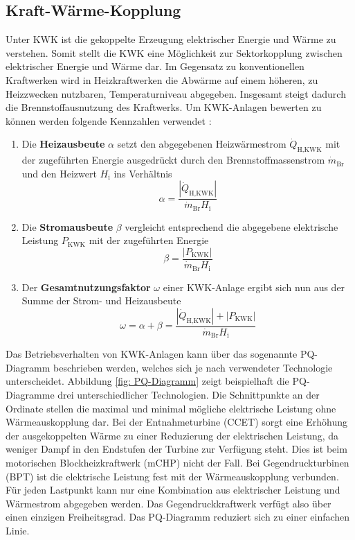 \subsection{Kraft-Wärme-Kopplung}
Unter \acf{KWK} ist die gekoppelte Erzeugung elektrischer Energie und Wärme zu verstehen. Somit stellt die \ac{KWK} eine Möglichkeit zur Sektorkopplung zwischen elektrischer Energie und Wärme dar. Im Gegensatz zu konventionellen Kraftwerken wird in Heizkraftwerken die Abwärme auf einem höheren, zu Heizzwecken nutzbaren, Temperaturniveau abgegeben. Insgesamt steigt dadurch die Brennstoffausnutzung des Kraftwerks. Um \ac{KWK}-Anlagen bewerten zu können werden folgende Kennzahlen verwendet \cite{VDI4608}:
	\begin{enumerate}
		\item Die \textbf{Heizausbeute} $\alpha$ setzt den abgegebenen Heizwärmestrom $\dot{Q}_\text{H,KWK}$ mit der zugeführten Energie ausgedrückt durch den Brennstoffmassenstrom $\dot{m}_\text{Br}$ und den Heizwert $H_\text{i}$ ins Verhältnis
		\begin{equation}\label{equation: Heizausbeute}
			\alpha = \dfrac{|\dot{Q}_\text{H,KWK}|}{\dot{m}_\text{Br}H_\text{i}}
		\end{equation}	
		
		\item Die \textbf{Stromausbeute} $\beta$ vergleicht entsprechend die abgegebene elektrische Leistung $P_\text{KWK}$ mit der zugeführten Energie
		\begin{equation}\label{equation: Stromausbeute}
			\beta = \dfrac{|P_\text{KWK}|}{\dot{m}_\text{Br}H_\text{i}}
		\end{equation}
		
		\item Der \textbf{Gesamtnutzungsfaktor} $\omega$ einer \ac{KWK}-Anlage ergibt sich nun aus der Summe der Strom- und Heizausbeute
		\begin{equation}\label{equation: Gesamtnutzungsfaktor}
			\omega = \alpha + \beta = \dfrac{|\dot{Q}_\text{H,KWK}| + |P_\text{KWK}|}{\dot{m}_\text{Br}H_\text{i}}
		\end{equation}
	\end{enumerate}
Das Betriebsverhalten von \ac{KWK}-Anlagen kann über das sogenannte PQ-Diagramm beschrieben werden, welches sich je nach verwendeter Technologie unterscheidet. Abbildung \ref{fig: PQ-Diagramm} zeigt beispielhaft die PQ-Diagramme drei unterschiedlicher Technologien. Die Schnittpunkte an der Ordinate stellen die maximal und minimal mögliche elektrische Leistung ohne Wärmeauskopplung dar. Bei der Entnahmeturbine (CCET) sorgt eine Erhöhung der ausgekoppelten Wärme zu einer Reduzierung der elektrischen Leistung, da weniger Dampf in den Endstufen der Turbine zur Verfügung steht. Dies ist beim motorischen Blockheizkraftwerk (mCHP) nicht der Fall. Bei Gegendruckturbinen (BPT) ist die elektrische Leistung fest mit der Wärmeauskopplung verbunden. Für jeden Lastpunkt kann nur eine Kombination aus elektrischer Leistung und Wärmestrom abgegeben werden. Das Gegendruckkraftwerk verfügt also über einen einzigen Freiheitsgrad. Das PQ-Diagramm reduziert sich zu einer einfachen Linie.
